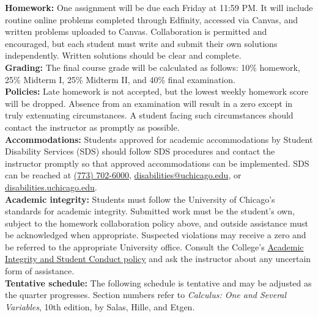 \documentclass[12pt,letterpaper]{article}
\newcommand{\field}[1]{\textbf{#1}}
\begin{document}
\field{Homework:} One assignment will be due each Friday at 11:59 PM. It will include routine online problems completed through Edfinity, accessed via Canvas, and written problems uploaded to Canvas. Collaboration is permitted and encouraged, but each student must write and submit their own solutions independently. Written solutions should be clear and complete.\\

\field{Grading:} The final course grade will be calculated as follows: 10\% homework, 25\% Midterm I, 25\% Midterm II, and 40\% final examination.\\

\field{Policies:} Late homework is not accepted, but the lowest weekly homework score will be dropped. Absence from an examination will result in a zero except in truly extenuating circumstances. A student facing such circumstances should contact the instructor as promptly as possible.\\

\field{Accommodations:} Students approved for academic accommodations by Student Disability Services (SDS) should follow SDS procedures and contact the instructor promptly so that approved accommodations can be implemented. SDS can be reached at \href{tel:+17737026000}{(773) 702-6000}, \href{mailto:disabilities@uchicago.edu}{disabilities@uchicago.edu}, or \href{https://disabilities.uchicago.edu/}{disabilities.uchicago.edu}.\\

\field{Academic integrity:} Students must follow the University of Chicago's standards for academic integrity. Submitted work must be the student's own, subject to the homework collaboration policy above, and outside assistance must be acknowledged when appropriate. Suspected violations may receive a zero and be referred to the appropriate University office. Consult the College's \href{https://college.uchicago.edu/student-services/academic-integrity-student-conduct}{Academic Integrity and Student Conduct policy} and ask the instructor about any uncertain form of assistance.\\


\field{Tentative schedule:} The following schedule is tentative and may be adjusted as the quarter progresses. Section numbers refer to \textit{Calculus: One and Several Variables}, 10th edition, by Salas, Hille, and Etgen.
\end{document}
